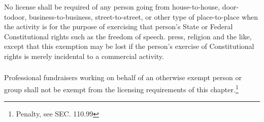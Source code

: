 \subsubsection{}
No license shall be required of any person going from house-to-house, door-todoor, business-to-business, street-to-street, or other type of place-to-place when the activity is for the purpose of exercising that person's State or Federal Constitutional rights such as the freedom of speech. press, religion and the like, except that this exemption may be lost if the person's exercise of Constitutional rights is merely incidental to a commercial activity.
\subsubsection{}
Professional fundraisers working on behalf of an otherwise exempt person or group shall not be exempt from the licensing requirements of this chapter.\footnote{Penalty, see SEC. 110.99}

